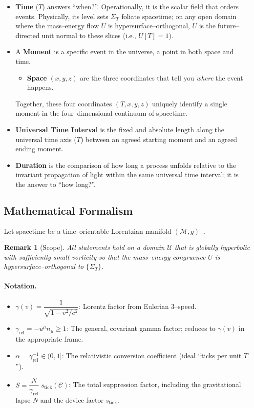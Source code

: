 \documentclass[12pt]{article}
\theoremstyle{plain} %
\newtheorem{remark}{Remark}
\newcommand{\gammarel}{\gamma_{\!\mathrm{rel}}}
\begin{document}
\begin{itemize}
  \item \textbf{Time} ($T$) answers ``when?''. Operationally, it is the scalar field that orders events. Physically, its level sets $\Sigma_T$ foliate spacetime; on any open domain where the mass–energy flow $U$ is hypersurface–orthogonal, $U$ is the future–directed unit normal to these slices (i.e., $U[T]=1$).
  \item A \textbf{Moment} is a specific event in the universe, a point in both space and time.
    \begin{itemize}
      \item \textbf{Space} $(x,y,z)$ are the three coordinates that tell you \emph{where} the event happens.
    \end{itemize}
    Together, these four coordinates $(T,x,y,z)$ uniquely identify a single moment in the four–dimensional continuum of spacetime.
  \item \textbf{Universal Time Interval} is the fixed and absolute length along the universal time axis ($T$) between an agreed starting moment and an agreed ending moment.
  \item \textbf{Duration} is the comparison of how long a process unfolds relative to the invariant propagation of light within the same universal time interval; it is the answer to ``how long?''.
\end{itemize}

\subsection*{Mathematical Formalism}

Let spacetime be a time–orientable Lorentzian manifold $(\mathcal{M}, g)$~\cite{Carroll2004}.

\begin{remark}[Scope]
All statements hold on a domain $\mathcal{U}$ that is globally hyperbolic with sufficiently small vorticity so that the mass–energy congruence $U$ is hypersurface–orthogonal to $\{\Sigma_T\}$.
\end{remark}

\paragraph{Notation.}
\begin{itemize}
  \item $\gamma(v) = \dfrac{1}{\sqrt{1 - v^2/c^2}}$: Lorentz factor from Eulerian 3–speed.
  \item $\gammarel = -u^\mu n_\mu \geq 1$: The general, covariant gamma factor; reduces to $\gamma(v)$ in the appropriate frame.
  \item $\alpha = \gammarel^{-1} \in (0,1]$: The relativistic conversion coefficient (ideal ``ticks per unit $T$'').
  \item $S = \dfrac{N}{\gammarel}\; s_{\mathrm{tick}}(\mathcal{C})$: The total suppression factor, including the gravitational lapse $N$ and the device factor $s_{\mathrm{tick}}$.
\end{itemize}
\end{document}
